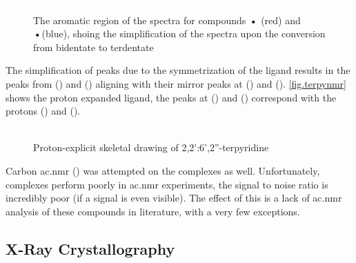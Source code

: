 \begin{figure}[!htbp]
 \begin{center}
  \includegraphics[clip=true]{images/insertgraphic.eps}
 \end{center}
\caption[The aromatic region of the \texorpdfstring{}{1H}  spectra showing bidentate - terdentate conversion]{The aromatic region of the \texorpdfstring{}{1H}  spectra for compounds \textbf{•} (red) and \textbf{•}(blue), shoing the simplification of the spectra upon the conversion from bidentate to terdentate}
\label{fig.bidtoter}
\end{figure} 

The simplification of peaks due to the symmetrization of the ligand results in the peaks from () and () aligning with their mirror peaks at () and (). \autoref{fig.terpynmr} shows the proton expanded ligand, the peaks at () and () correspond with the protons () and (). 

\begin{figure}[!htbp]
 \begin{center}
  \includegraphics[clip=true]{images/insertgraphic.eps}
 \end{center}
\caption[Proton-explicit skeletal drawing of 2,2':6',2''-terpyridine]{Proton-explicit skeletal drawing of 2,2':6',2''-terpyridine}
\label{fig.termpynmr}
\end{figure} 

Carbon \gls{ac.nmr} () was attempted on the complexes as well. Unfortunately,  complexes perform poorly in  \gls{ac.nmr} experiments, the signal to noise ratio is incredibly poor (if a signal is even visible). The effect of this is a lack of  \gls{ac.nmr} analysis of these compounds in literature, with a very few exceptions. 

\subsection{X-Ray Crystallography}

